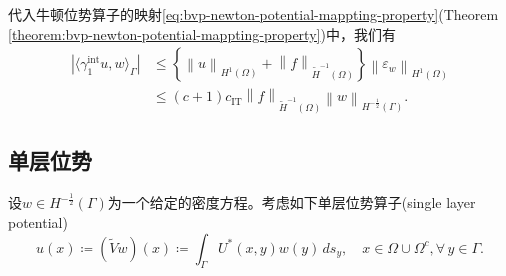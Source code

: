 代入牛顿位势算子的映射\eqref{eq:bvp-newton-potential-mappting-property}(Theorem \ref{theorem:bvp-newton-potential-mappting-property})中，我们有
\begin{equation*}
  \begin{split}
    \left|
    \langle \gamma_{1}^{\text{int}} u , w \rangle_{\Gamma}
    \right|
    & \le
    \left\{
    \left\| u \right\|_{H^{1}(\Omega)} +
    \left\| f \right\|_{\widetilde{H}^{-1}(\Omega)}
    \right\}
    \left\| \varepsilon_w \right\|_{H^{1}(\Omega)} \\
    & \le
    (c+1) c_{\text{IT}}
    \left\| f \right\|_{\widetilde{H}^{-1}(\Omega)}
    \left\| w \right\|_{H^{-\frac{1}{2}}(\Gamma)}.
  \end{split}
\end{equation*}

\subsection{单层位势}
\label{sec:bvp-single-layer-potential}
设$w \in H^{-\frac{1}{2}}(\Gamma)$为一个给定的密度方程。考虑如下单层位势算子(single layer potential)
\begin{equation}
  \label{eq:bvp-single-layer-potential-operator}
  u(x) \coloneqq \left( \widetilde{V} w \right) (x)
  \coloneqq \int_{\Gamma} U^{*}(x,y) w(y) \, d s_y,  \quad x \in \Omega \cup \Omega^{c}, \forall \, y \in \Gamma.
\end{equation}

